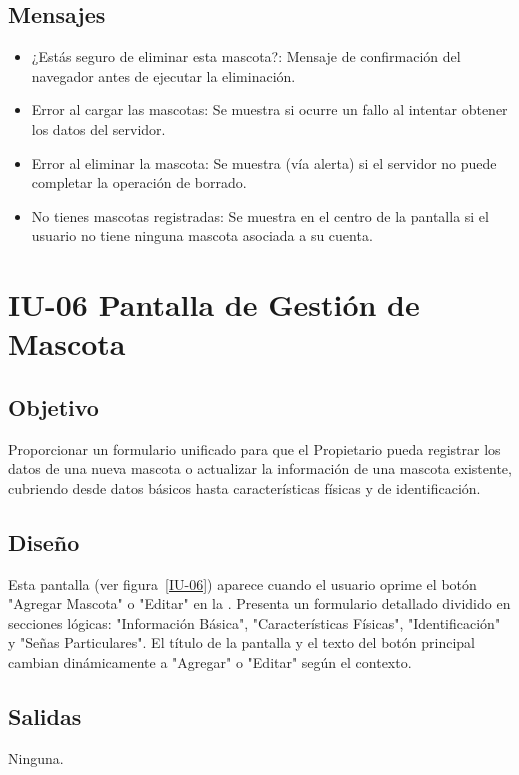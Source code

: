 \subsection{Mensajes}
\begin{itemize}
    \item ¿Estás seguro de eliminar esta mascota?: Mensaje de confirmación del navegador antes de ejecutar la eliminación.
    \item Error al cargar las mascotas: Se muestra si ocurre un fallo al intentar obtener los datos del servidor.
    \item Error al eliminar la mascota: Se muestra (vía alerta) si el servidor no puede completar la operación de borrado.
    \item No tienes mascotas registradas: Se muestra en el centro de la pantalla si el usuario no tiene ninguna mascota asociada a su cuenta.
\end{itemize}
\section{IU-06 Pantalla de Gestión de Mascota}

\subsection{Objetivo}
    Proporcionar un formulario unificado para que el Propietario pueda registrar los datos de una nueva mascota o actualizar la información de una mascota existente, cubriendo desde datos básicos hasta características físicas y de identificación.

\subsection{Diseño}
    Esta pantalla  (ver figura~\ref{IU-06}) aparece cuando el usuario oprime el botón "Agregar Mascota" o "Editar" en la . Presenta un formulario detallado dividido en secciones lógicas: "Información Básica", "Características Físicas", "Identificación" y "Señas Particulares". El título de la pantalla y el texto del botón principal cambian dinámicamente a "Agregar" o "Editar" según el contexto.

\subsection{Salidas}
    Ninguna.

